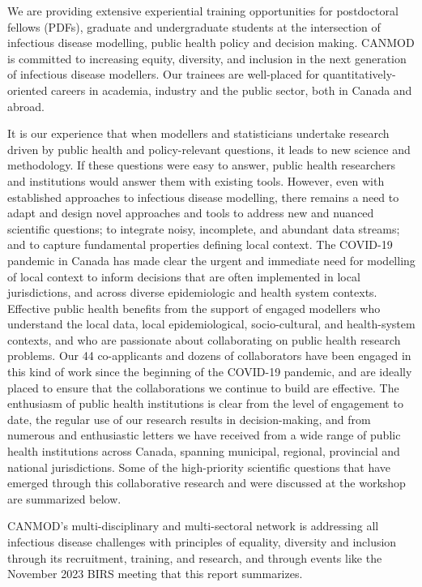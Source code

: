 We are providing extensive experiential training opportunities for
postdoctoral fellows (PDFs), graduate and undergraduate students at
the intersection of infectious disease modelling, public health policy
and decision making. CANMOD is committed to increasing equity,
diversity, and inclusion in the next generation of infectious disease
modellers. Our trainees are well-placed for quantitatively-oriented
careers in academia, industry and the public sector, both in Canada
and abroad.

It is our experience that when modellers and statisticians undertake
research driven by public health and policy-relevant questions, it
leads to new science and methodology. If these questions were easy to
answer, public health researchers and institutions would answer them
with existing tools. However, even with established approaches to
infectious disease modelling, there remains a need to adapt and design
novel approaches and tools to address new and nuanced scientific
questions; to integrate noisy, incomplete, and abundant data streams;
and to capture fundamental properties defining local context. The
COVID-19 pandemic in Canada has made clear the urgent and immediate
need for modelling of local context to inform decisions that are often
implemented in local jurisdictions, and across diverse epidemiologic
and health system contexts. Effective public health benefits from the
support of engaged modellers who understand the local data, local
epidemiological, socio-cultural, and health-system contexts, and who
are passionate about collaborating on public health research
problems. Our 44 co-applicants and dozens of collaborators have been
engaged in this kind of work since the beginning of the COVID-19
pandemic, and are ideally placed to ensure that the collaborations we
continue to build are effective. The enthusiasm of public health
institutions is clear from the level of engagement to date, the
regular use of our research results in decision-making, and from
numerous and enthusiastic letters we have received from a wide range
of public health institutions across Canada, spanning municipal,
regional, provincial and national jurisdictions. Some of the
high-priority scientific questions that have emerged through this
collaborative research and were discussed at the workshop
are summarized below.

CANMOD’s multi-disciplinary and multi-sectoral network is addressing
all infectious disease challenges with principles of equality,
diversity and inclusion through its recruitment, training, and
research, and through events like the November 2023 BIRS meeting that
this report summarizes.

